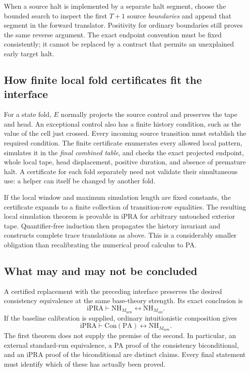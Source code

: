 When a source halt is implemented by a separate halt segment, choose the
bounded search to inspect the first $T+1$ source \emph{boundaries} and append
that segment in the forward translator. Positivity for ordinary boundaries
still proves the same reverse argument. The exact endpoint convention must
be fixed consistently; it cannot be replaced by a contract that permits an
unexplained early target halt.

\subsection{How finite local fold certificates fit the interface}

For a state fold, $E$ normally projects the source control and preserves
the tape and head. An exceptional control also has a finite history
condition, such as the value of the cell just crossed. Every incoming
source transition must establish the required condition. The finite
certificate enumerates every allowed local pattern, simulates it in the
\emph{final combined table}, and checks the exact projected endpoint, whole
local tape, head displacement, positive duration, and absence of premature
halt. A certificate for each fold separately need not validate their
simultaneous use: a helper can itself be changed by another fold.

If the local window and maximum simulation length are fixed constants, the
certificate expands to a finite collection of transition-row equalities.
The resulting local simulation theorem is provable in iPRA for arbitrary
untouched exterior tape. Quantifier-free induction then propagates the
history invariant and constructs complete trace translations as above.
This is a considerably smaller obligation than recalibrating the numerical
proof calculus to PA.

\subsection{What may and may not be concluded}

A certified replacement with the preceding interface preserves the desired
consistency equivalence at the same base-theory strength. Its exact conclusion
is
\[
 \mathrm{iPRA}\vdash\mathrm{NH}_{M_{\mathrm{new}}}
                         \leftrightarrow\mathrm{NH}_{M_{\mathrm{old}}}.
\]
If the baseline calibration is supplied, ordinary intuitionistic composition
gives
\[
 \mathrm{iPRA}\vdash\mathrm{Con}(\mathrm{PA})
                         \leftrightarrow\mathrm{NH}_{M_{\mathrm{new}}}.
\]
The first theorem does not supply the premise of the second. In particular,
an external standard-run equivalence, a PA proof of the consistency
biconditional, and an iPRA proof of the biconditional are distinct claims.
Every final statement must identify which of these has actually been proved.
